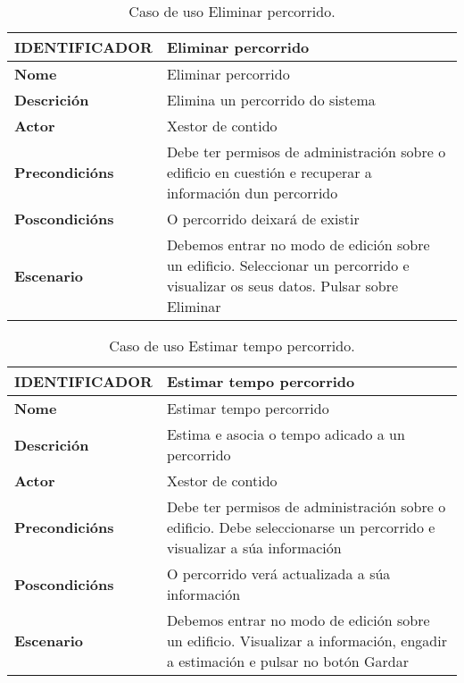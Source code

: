 \begin{table}[tbh]
	\begin{tabular}{|l|p{10cm}|}
		\hline 
		\textbf{IDENTIFICADOR}	& \textbf{Eliminar percorrido} \\ 
		\hline 
		\textbf{Nome} & Eliminar percorrido \\ 
		\hline 
		\textbf{Descrición} & Elimina un percorrido do sistema \\ 
		\hline 
		\textbf{Actor} & Xestor de contido \\ 
		\hline 
		\textbf{Precondicións} & Debe ter permisos de administración sobre o edificio en cuestión e recuperar a información dun percorrido \\ 
		\hline 
		\textbf{Poscondicións} & O percorrido deixará de existir \\ 
		\hline 
		\textbf{Escenario} & Debemos entrar no modo de edición sobre un edificio. Seleccionar un percorrido e visualizar os seus datos. Pulsar sobre Eliminar \\ 
		\hline 
	\end{tabular}
	\caption{Caso de uso Eliminar percorrido.}
	\label{tab:cuEliminarPercorrido}
\end{table}

\begin{table}[tbh]
	\begin{tabular}{|l|p{10cm}|}
		\hline 
		\textbf{IDENTIFICADOR}	& \textbf{Estimar tempo percorrido} \\ 
		\hline 
		\textbf{Nome} & Estimar tempo percorrido \\ 
		\hline 
		\textbf{Descrición} & Estima e asocia o tempo adicado a un percorrido \\ 
		\hline 
		\textbf{Actor} & Xestor de contido \\ 
		\hline 
		\textbf{Precondicións} & Debe ter permisos de administración sobre o edificio. Debe seleccionarse un percorrido e visualizar a súa información \\ 
		\hline 
		\textbf{Poscondicións} & O percorrido verá actualizada a súa información \\ 
		\hline 
		\textbf{Escenario} & Debemos entrar no modo de edición sobre un edificio. Visualizar a información, engadir a estimación e pulsar no botón Gardar \\ 
		\hline 
	\end{tabular}
	\caption{Caso de uso Estimar tempo percorrido.}
	\label{tab:cuEstimarTempoPercorrido}
\end{table}

